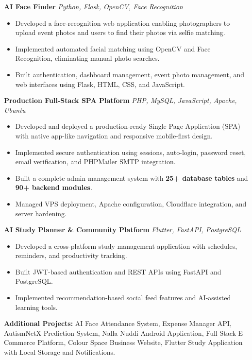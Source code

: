 \documentclass[10pt,a4paper]{article}
\begin{document}
\textbf{AI Face Finder}
\hfill \textit{Python, Flask, OpenCV, Face Recognition}

\begin{itemize}
\item Developed a face-recognition web application enabling photographers to upload event photos and users to find their photos via selfie matching.
\item Implemented automated facial matching using OpenCV and Face Recognition, eliminating manual photo searches.
\item Built authentication, dashboard management, event photo management, and web interfaces using Flask, HTML, CSS, and JavaScript.
\end{itemize}

\textbf{Production Full-Stack SPA Platform}
\hfill \textit{PHP, MySQL, JavaScript, Apache, Ubuntu}

\begin{itemize}
\item Developed and deployed a production-ready Single Page Application (SPA) with native app-like navigation and responsive mobile-first design.
\item Implemented secure authentication using sessions, auto-login, password reset, email verification, and PHPMailer SMTP integration.
\item Built a complete admin management system with \textbf{25+ database tables} and \textbf{90+ backend modules}.
\item Managed VPS deployment, Apache configuration, Cloudflare integration, and server hardening.
\end{itemize}

\textbf{AI Study Planner \& Community Platform}
\hfill \textit{Flutter, FastAPI, PostgreSQL}

\begin{itemize}
\item Developed a cross-platform study management application with schedules, reminders, and productivity tracking.
\item Built JWT-based authentication and REST APIs using FastAPI and PostgreSQL.
\item Implemented recommendation-based social feed features and AI-assisted learning tools.
\end{itemize}

\textbf{Additional Projects:}
AI Face Attendance System, Expense Manager API, AutismNetX Prediction System, Nalla-Nuddi Android Application, Full-Stack E-Commerce Platform, Colour Space Business Website, Flutter Study Application with Local Storage and Notifications.
\end{document}
